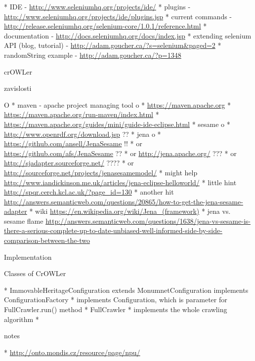 \begitems
  * IDE - \url{http://www.seleniumhq.org/projects/ide/}
  * plugins - \url{http://www.seleniumhq.org/projects/ide/plugins.jsp}
  * current commands - \url{http://release.seleniumhq.org/selenium-core/1.0.1/reference.html}
  * documentation - \url{http://docs.seleniumhq.org/docs/index.jsp}
  * extending selenium API (blog, tutorial) - \url{http://adam.goucher.ca/?s=selenium&paged=2}
  \begitems
    * randomString example - \url{http://adam.goucher.ca/?p=1348}
  \enditems
\enditems






\chap crOWLer

\sec zavislosti

\begitems \style O
  * maven - apache project managing tool
  \begitems \style o
    * \url{https://maven.apache.org}
    * \url{https://maven.apache.org/run-maven/index.html}
    * \url{https://maven.apache.org/guides/mini/guide-ide-eclipse.html}
  \enditems
  * sesame
  \begitems \style o
    * \url{http://www.openrdf.org/download.jsp} ??
  \enditems
  * jena
  \begitems \style o
    * \url{https://github.com/ansell/JenaSesame} !!
    * or \url{https://github.com/afs/JenaSesame} ??
    * or \url{http://jena.apache.org/} ???
    * or \url{http://sjadapter.sourceforge.net/} ????
    * or \url{http://sourceforge.net/projects/jenasesamemodel/}
    * might help \url{http://www.iandickinson.me.uk/articles/jena-eclipse-helloworld/}
    * little hint \url{http://spqr.cerch.kcl.ac.uk/?page_id=130}
    * another hit \url{http://answers.semanticweb.com/questions/20865/how-to-get-the-jena-sesame-adapter}
    * wiki \url{https://en.wikipedia.org/wiki/Jena_(framework)}
    * jena vs. sesame flame \url{http://answers.semanticweb.com/questions/1638/jena-vs-sesame-is-there-a-serious-complete-up-to-date-unbiased-well-informed-side-by-side-comparison-between-the-two}
  \enditems
\enditems


\sec Implementation


\secc Classes of CrOWLer

\begitems
  * ImmovableHeritageConfiguration extends MonumnetConfiguration implements ConfigurationFactory 
  \begitems
    * implements Configuration, which is parameter for FullCrawler.run() method
  \enditems
  * FullCrawler
  \begitems
    * implements the whole crawling algorithm
    * 
  \enditems
\enditems


\sec notes

\begitems
  * \url{http://onto.mondis.cz/resource/page/npu/}
\enditems


